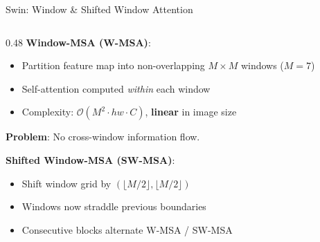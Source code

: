 \begin{frame}{Swin: Window \& Shifted Window Attention}

  \begin{columns}
    \begin{column}{0.48\textwidth}
      \textbf{Window-MSA (W-MSA)}:
      \begin{itemize}
        \item Partition feature map into non-overlapping $M{\times}M$ windows ($M{=}7$)
        \item Self-attention computed \emph{within} each window
        \item Complexity: $\mathcal{O}(M^2 \cdot hw \cdot C)$, \textbf{linear} in image size
      \end{itemize}

      \vspace{0.3em}
      \textbf{Problem}: No cross-window information flow.

      \vspace{0.3em}
      \textbf{Shifted Window-MSA (SW-MSA)}:
      \begin{itemize}
        \item Shift window grid by $(\lfloor M/2\rfloor, \lfloor M/2\rfloor)$
        \item Windows now straddle previous boundaries
        \item Consecutive blocks alternate W-MSA / SW-MSA
      \end{itemize}


\end{column}
\end{columns}
\end{frame}
